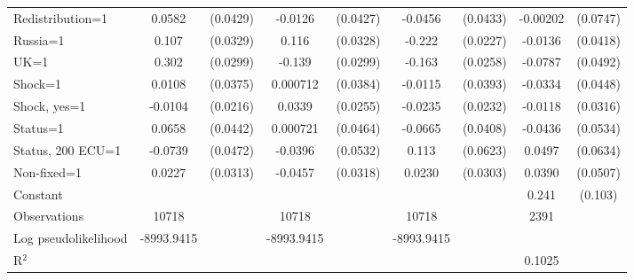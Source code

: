 \begin{tabular}{l|cccccc|cc}
Redistribution=1&   0.0582         & (0.0429)&  -0.0126         & (0.0427)&  -0.0456         & (0.0433)& -0.00202         & (0.0747)\\
Russia=1        &    0.107\sym{***}& (0.0329)&    0.116\sym{***}& (0.0328)&   -0.222\sym{***}& (0.0227)&  -0.0136         & (0.0418)\\
UK=1            &    0.302\sym{***}& (0.0299)&   -0.139\sym{***}& (0.0299)&   -0.163\sym{***}& (0.0258)&  -0.0787         & (0.0492)\\
Shock=1         &   0.0108         & (0.0375)& 0.000712         & (0.0384)&  -0.0115         & (0.0393)&  -0.0334         & (0.0448)\\
Shock, yes=1    &  -0.0104         & (0.0216)&   0.0339         & (0.0255)&  -0.0235         & (0.0232)&  -0.0118         & (0.0316)\\
Status=1        &   0.0658         & (0.0442)& 0.000721         & (0.0464)&  -0.0665         & (0.0408)&  -0.0436         & (0.0534)\\
Status, 200 ECU=1&  -0.0739         & (0.0472)&  -0.0396         & (0.0532)&    0.113\sym{*}  & (0.0623)&   0.0497         & (0.0634)\\
Non-fixed=1     &   0.0227         & (0.0313)&  -0.0457         & (0.0318)&   0.0230         & (0.0303)&   0.0390         & (0.0507)\\
Constant        &                  &         &                  &         &                  &         &    0.241\sym{**} &  (0.103)\\
\hline
Observations    &    10718         &         &    10718         &         &    10718         &         &     2391         &         \\
Log pseudolikelihood  & -8993.9415   &         &   -8993.9415               &         &      -8993.9415            &         &           &   \\ 
R$^2$      &                  &         &                  &         &                  &         &     0.1025       &   \\ 


\end{tabular}
